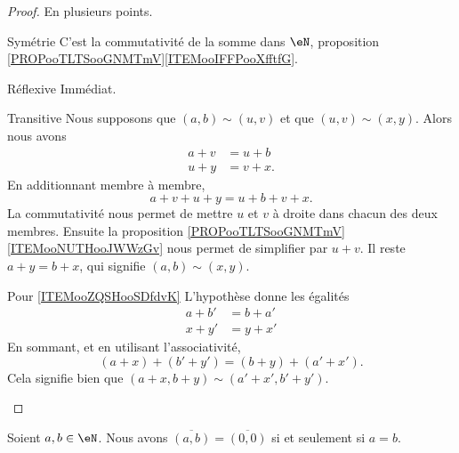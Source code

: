 \begin{proof}
    En plusieurs points.
    \begin{subproof}
    \item[Symétrie]
        C'est la commutativité de la somme dans \( \eN\), proposition \ref{PROPooTLTSooGNMTmV}\ref{ITEMooIFFPooXfftfG}.
    \item[Réflexive]
        Immédiat.
    \item[Transitive]
        Nous supposons que \( (a,b)\sim(u,v)\) et que \( (u,v)\sim(x,y)\). Alors nous avons
        \begin{subequations}
            \begin{align}
                a+v&=u+b\\
                u+y&=v+x.
            \end{align}
        \end{subequations}
        En additionnant membre à membre,
        \begin{equation}
            a+v+u+y=u+b+v+x.
        \end{equation}
        La commutativité nous permet de mettre \( u\) et \( v\) à droite dans chacun des deux membres. Ensuite la proposition \ref{PROPooTLTSooGNMTmV}\ref{ITEMooNUTHooJWWzGv} nous permet de simplifier par \( u+v\). Il reste \( a+y=b+x\), qui signifie \( (a,b)\sim(x,y)\).
    \item[Pour \ref{ITEMooZQSHooSDfdvK}]
        L'hypothèse donne les égalités
        \begin{subequations}
            \begin{align}
                a+b'&=b+a'\\
                x+y'&=y+x'
            \end{align}
        \end{subequations}
        En sommant, et en utilisant l'associativité,
        \begin{equation}
            (a+x)+(b'+y')=(b+y)+(a'+x').
        \end{equation}
        Cela signifie bien que \( (a+x,b+y)\sim(a'+x',b'+y')\).
    \end{subproof}
\end{proof}

\begin{lemma}
    Soient \( a,b\in \eN\). Nous avons \( \overline{ (a,b) }=\overline{ (0,0) }\) si et seulement si \( a=b\).
\end{lemma}

